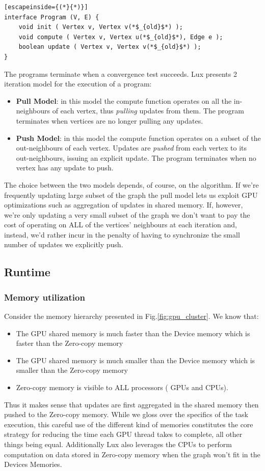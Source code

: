 \documentclass[]{article}
\begin{document}
\begin{lstlisting}[escapeinside={(*}{*)}]
interface Program (V, E) {
    void init ( Vertex v, Vertex v(*$_{old}$*) );
    void compute ( Vertex v, Vertex u(*$_{old}$*), Edge e );
    boolean update ( Vertex v, Vertex v(*$_{old}$*) );
}
\end{lstlisting}
The programs terminate when a convergence test succeeds.
Lux presents 2 iteration model for the execution of a program:
\begin{itemize}
	\item \textbf{Pull Model}: in this model the compute function operates on all the in-neighbours of each vertex, thus \textit{pulling} updates from them. The program terminates when vertices are no longer pulling any updates.
	\item \textbf{Push Model}: in this model the compute function operates on a subset of the out-neighbours of each vertex. Updates are \textit{pushed} from each vertex to its out-neighbours, issuing an explicit update. The program terminates when no vertex has any update to push.
\end{itemize}
The choice between the two models depends, of course, on the algorithm. If we're frequently updating large subset of the graph the pull model lets us exploit GPU optimizations such as aggregation of updates in shared memory. If, however, we're only updating a very small subset of the graph we don't want to pay the cost of operating on ALL of the vertices' neighbours at each iteration and, instead, we'd rather incur in the penalty of having to synchronize the small number of updates we explicitly push.

\subsection{Runtime}
\subsubsection{Memory utilization}
Consider the memory hierarchy presented in Fig.\ref{fig:gpu_cluster}. We know that:
\begin{itemize}
	\item The GPU shared memory is much faster than the Device memory which is faster than the Zero-copy memory
	\item The GPU shared memory is much smaller than the Device memory which is smaller than the Zero-copy memory
	\item Zero-copy memory is visible to ALL processors ( GPUs and CPUs).
\end{itemize}
Thus it makes sense that updates are first aggregated in the shared memory then pushed to the Zero-copy memory. While we gloss over the specifics of the task execution, this careful use of the different kind of memories constitutes the core strategy for reducing the time each GPU thread takes to complete, all other things being equal. Additionally Lux also leverages the CPUs to perform computation on data stored in Zero-copy memory when the graph won't fit in the Devices Memories.
\end{document}
